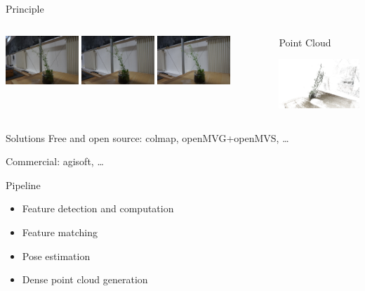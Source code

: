 \documentclass{beamer}
\begin{document}
\begin{frame}{Principle}
\begin{columns}
\begin{column}{0.45\textwidth}
            \includegraphics[width=0.3\textwidth]{images/rgb006.jpg}
            \includegraphics[width=0.3\textwidth]{images/rgb007.jpg}
            \includegraphics[width=0.3\textwidth]{images/rgb008.jpg}
        \end{column}
        \begin{column}{0.1\textwidth}
$\Rightarrow$
        \end{column}
        \begin{column}{0.45\textwidth}
            \centering
            Point Cloud

             \includegraphics[width=\textwidth]{images/pointcloud.png}
        \end{column}
    \end{columns}
        \vspace{2em}
    \begin{block}{Solutions}
        Free and open source: colmap, openMVG+openMVS, \dots

        Commercial: agisoft, \dots

    \end{block}
\end{frame}
\begin{frame}{Pipeline}
    \begin{itemize}
        \item Feature detection and computation
        \item Feature matching
        \item Pose estimation
        \item Dense point cloud generation
    \end{itemize}
\end{frame}
\end{document}
